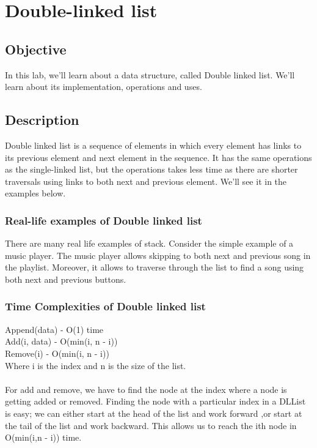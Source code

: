 \documentclass[11pt,fleqn]{book} %
\begin{document}


\pagestyle{empty} %

\tableofcontents %

\cleardoublepage %

\chapter{Double-linked list}
\section{Objective}
In this lab, we'll learn about a data structure, called Double linked list. We'll learn about its implementation, operations and uses.
\section{Description}
Double linked list is a sequence of elements in which every element has links to its previous element and next element in the sequence.
It has the same operations as the single-linked list, but the operations takes less time as there are shorter traversals using links to both next and previous element. We'll see it in the examples below.
 
\subsection{Real-life examples of Double linked list}
There are many real life examples of stack. Consider the simple example of a music player. The music player allows skipping to both next and previous song in the playlist. Moreover, it allows to traverse through the list to find a song using both next and previous buttons.

\subsection{Time Complexities of Double linked list}
Append(data) - O(1) time \\
Add(i, data) - O(min(i, n - i))\\
Remove(i) - O(min(i, n - i))\\ 
Where i is the index and n is the size of the list.\\ \\
For add and remove, we have to find the node at the index where a node is getting added or removed. Finding the node with a particular index in a DLList is easy; we can either start at the head of the list and work forward ,or start at the tail of the list and work backward. This allows us to reach the ith node in O(min(i,n - i)) time.
 
\end{document}
